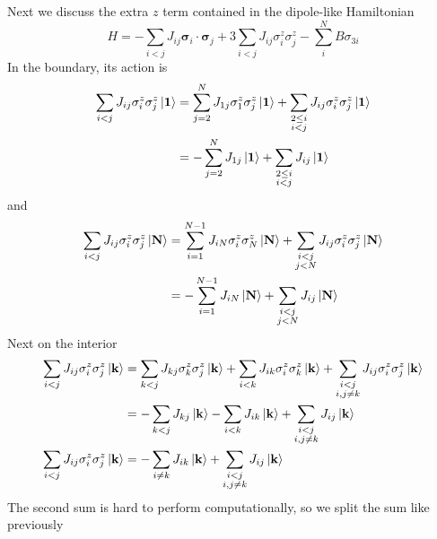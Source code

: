 \documentclass[../../../main.tex]{subfiles}
\begin{document}
Next we discuss the extra $z$ term contained in the  dipole-like Hamiltonian
\begin{equation*}
    H =  - \sum_{i<j} J_{ij} \boldsymbol{\sigma}_i \cdot\boldsymbol{\sigma}_{j} + 3\sum_{i<j} J_{ij} \sigma^z_i \sigma^z_j  - \sum_{i } ^N B \sigma_{3i}
\end{equation*}
In the boundary, its action is
\begin{align*}
    \sum_{i<j} J_{ij} \sigma^z_i \sigma^z_j \ket{\mathbf{1}}
     & = \sum_{j=2}^{N}  J_{1j} \sigma^z_1 \sigma^z_j \ket{\mathbf{1}} + \sum_{\substack{2\leq i \\i<j}} J_{ij}  \sigma^z_i \sigma^z_j \ket{\mathbf{1}}\\
     & =- \sum_{j=2}^{N}  J_{1j} \ket{\mathbf{1}} + \sum_{\substack{2\leq i                      \\i<j}} J_{ij} \ket{\mathbf{1}}
\end{align*}
and
\begin{align*}
    \sum_{i<j} J_{ij} \sigma^z_i \sigma^z_j \ket{\mathbf{N}}
     & =  \sum_{i=1}^{N-1}  J_{iN}\sigma^z_i \sigma^z_N  \ket{\mathbf{N}} + \sum_{\substack{i<j \\j < N}} J_{ij}\sigma^z_i \sigma^z_j \ket{\mathbf{N}} \\
     & =  -\sum_{i=1}^{N-1}  J_{iN}\ket{\mathbf{N}} + \sum_{\substack{i<j                       \\j < N}} J_{ij} \ket{\mathbf{N}}
\end{align*}
Next on the interior
\begin{align*}
    \sum_{i<j} J_{ij} \sigma^z_i \sigma^z_j \ket{\mathbf{k}}
     & =\sum_{k<j}J_{kj}\sigma^z_k \sigma^z_j\ket{\mathbf{k}} + \sum_{i<k}J_{ik} \sigma^z_i \sigma^z_k\ket{\mathbf{k}}  + \sum_{\substack{i<j \\i,j \neq k}}J_{ij}\sigma^z_i \sigma^z_j\ket{\mathbf{k}} \\
     & = - \sum_{k<j}J_{kj} \ket{\mathbf{k}} - \sum_{i<k}J_{ik} \ket{\mathbf{k}}  + \sum_{\substack{i<j                                       \\i,j \neq k}}J_{ij} \ket{\mathbf{k}} \\
    \sum_{i<j} J_{ij} \sigma^z_i \sigma^z_j \ket{\mathbf{k}}
     & = - \sum_{i \neq k} J_{ik} \ket{\mathbf{k}}  + \sum_{\substack{i<j                                                                     \\i,j \neq k}}J_{ij} \ket{\mathbf{k}}
\end{align*}
The second sum is hard to perform computationally, so we split the sum like previously
\end{document}
